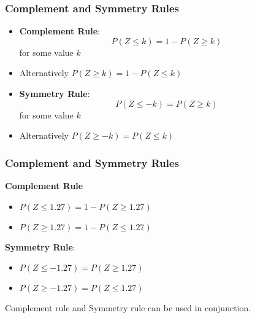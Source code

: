 \documentclass[a4]{beamer}
\begin{document}
\begin{frame}
\frametitle{Complement and Symmetry Rules}
\begin{itemize}
\item \textbf{Complement Rule}: \[ P(Z \leq k) = 1-P(Z \geq k) \] for some value $k$
\item Alternatively $ P(Z \geq k) = 1-P(Z \leq k) $
\item \textbf{Symmetry Rule}: \[ P(Z \leq -k) = P(Z \geq k) \] for some value $k$
\item Alternatively $ P(Z \geq -k) = P(Z \leq k) $
\end{itemize}
\end{frame}

\begin{frame}
\frametitle{Complement and Symmetry Rules}
\textbf{Complement Rule} 

\begin{itemize}
\item $P(Z \leq 1.27) = 1-P(Z \geq 1.27) $ 
\item $ P(Z \geq 1.27) = 1-P(Z \leq 1.27) $
\end{itemize}

\bigskip 
\textbf{Symmetry Rule}: 
\begin{itemize}
\item $ P(Z \leq -1.27) = P(Z \geq 1.27) $
\item $ P(Z \geq -1.27) = P(Z \leq 1.27) $
\end{itemize}

Complement rule and Symmetry rule can be used in conjunction.
\end{frame}
\end{document}
